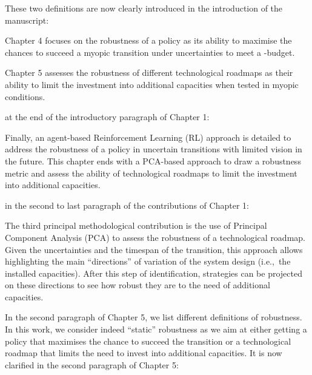 \documentclass[12pt,a4paper]{article}
\def\ie{i.e.,\ }
\begin{document}
These two definitions are now clearly introduced {\color{blue}in the introduction of the manuscript}:

\begin{mdframed}[style=manuscript] %
Chapter 4 focuses on the robustness of a policy as its ability to maximise the chances to succeed a myopic transition under uncertainties to meet a -budget.

Chapter 5 assesses the robustness of different technological roadmaps as their ability to limit the investment into additional capacities when tested in myopic conditions. 
\end{mdframed}

{\color{blue}at the end of the introductory paragraph of Chapter 1}:

\begin{mdframed}[style=manuscript] %
Finally, an agent-based Reinforcement Learning (RL) approach is detailed to address the robustness of a policy in uncertain transitions with limited vision in the future. This chapter ends with a PCA-based approach to draw a robustness metric and assess the ability of technological roadmaps to limit the investment into additional capacities.
\end{mdframed}

{\color{blue}in the second to last paragraph of the contributions of Chapter 1}:

\begin{mdframed}[style=manuscript] %
The third principal methodological contribution is the use of Principal Component Analysis (PCA) to assess the robustness of a technological roadmap. Given the uncertainties and the timespan of the transition, this approach allows highlighting the main ``directions'' of variation of the system design (\ie the installed capacities). After this step of identification, strategies can be projected on these directions to see how robust they are to the need of additional capacities.
\end{mdframed}

In the second paragraph of Chapter 5, we list different definitions of robustness. In this work, we consider indeed ``static'' robustness as we aim at either getting a policy that maximises the chance to succeed the transition or a technological roadmap that limits the need to invest into additional capacities. It is now clarified {\color{blue}in the second paragraph of Chapter 5}:
\end{document}
